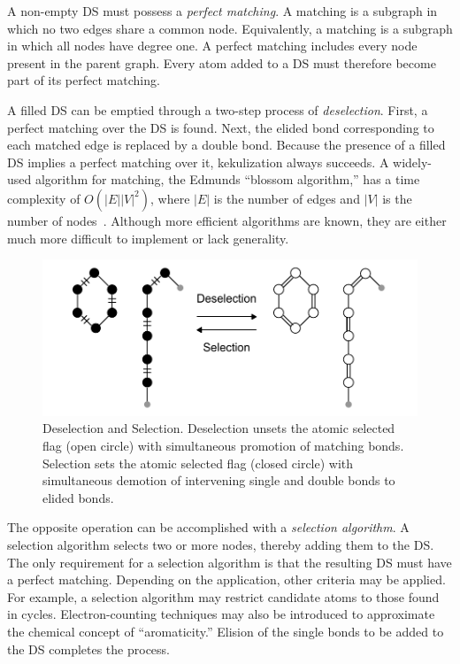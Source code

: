 \documentclass{article}
\begin{document}
A non-empty DS must possess a \textit{perfect matching}. A matching is a subgraph in which no two edges share a common node. Equivalently, a matching is a subgraph in which all nodes have degree one. A perfect matching includes every node present in the parent graph. Every atom added to a DS must therefore become part of its perfect matching.

A filled DS can be emptied through a two-step process of \textit{deselection}. First, a perfect matching over the DS is found. Next, the elided bond corresponding to each matched edge is replaced by a double bond. Because the presence of a filled DS implies a perfect matching over it, kekulization always succeeds. A widely-used algorithm for matching, the Edmunds \enquote{blossom algorithm,} has a time complexity of $O(|E||V|^2)$, where $|E|$ is the number of edges and $|V|$ is the number of nodes~\cite{edmonds:1965}. Although more efficient algorithms are known, they are either much more difficult to implement or lack generality.

\begin{figure}
    \centering
    \includegraphics[width=\columnwidth]{selection-and-deselection.pdf}
    \caption{Deselection and Selection. Deselection unsets the atomic selected flag (open circle) with simultaneous promotion of matching bonds. Selection sets the atomic selected flag (closed circle) with simultaneous demotion of intervening single and double bonds to elided bonds.}
    \label{fig:selection-and-deselection}
\end{figure}

The opposite operation can be accomplished with a \textit{selection algorithm}. A selection algorithm selects two or more nodes, thereby adding them to the DS. The only requirement for a selection algorithm is that the resulting DS must have a perfect matching. Depending on the application, other criteria may be applied. For example, a selection algorithm may restrict candidate atoms to those found in cycles. Electron-counting techniques may also be introduced to approximate the chemical concept of \enquote{aromaticity.} Elision of the single bonds to be added to the DS completes the process.
\end{document}
